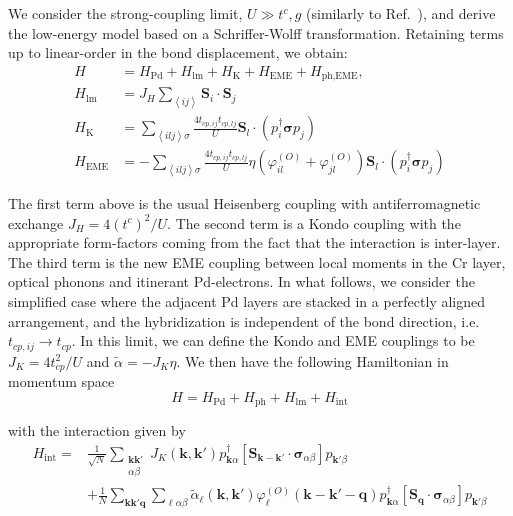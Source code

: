 \documentclass[aps,prl,twocolumn,superscriptaddress,amsmath,nofootinbib,10pt,floatfix]{revtex4-2}
\begin{document}
\begin{widetext}
We consider the strong-coupling limit, $U\gg t^{c},g$ (similarly to Ref.~\cite{sunko_probing_2020}), and derive the low-energy model based on a Schriffer-Wolff transformation. Retaining terms up to linear-order in the bond displacement, we obtain:
\begin{align}
H & =H_{\text{Pd}}+H_{\text{lm}}+H_{\text{K}}+H_{\text{EME}}+H_{\text{ph,EME}},\\
H_{\text{lm}} & =J_{H}\sum_{\left\langle ij\right\rangle }\boldsymbol{S}_{i}\cdot\boldsymbol{S}_{j}\\
H_{\text{K}} & =\sum_{\left\langle ilj\right\rangle \sigma}\frac{4t_{cp,ij}t_{cp,lj}}{U}\boldsymbol{S}_{l}\cdot\left(p_{i}^{\dagger}\boldsymbol{\sigma}p_{j}\right)\\
H_{\text{EME}} & =-\sum_{\left\langle ilj\right\rangle \sigma}\frac{4t_{cp,ij}t_{cp,lj}}{U}\eta\left(\varphi^{(O)}_{il}+\varphi^{(O)}_{jl}\right)\boldsymbol{S}_{l}\cdot\left(p_{i}^{\dagger}\boldsymbol{\sigma}p_{j}\right)
\end{align}

The first term above is the usual Heisenberg coupling with antiferromagnetic
exchange $J_{H}=4(t^{c})^2/U$. The second term  is a Kondo coupling \cite{sunko_probing_2020} with the appropriate form-factors coming from the fact that the interaction is inter-layer. The third term is the new EME coupling
between local moments in the Cr layer, optical phonons and itinerant Pd-electrons. In what follows, we consider the simplified case where the adjacent Pd layers are stacked in a perfectly aligned arrangement, and the hybridization is independent of the bond direction, i.e. $t_{cp,ij}\rightarrow t_{cp}$. In
this limit, we can define the Kondo and EME couplings to be $J_{K}=4t_{cp}^{2}/U$
and $\tilde{\alpha}=-J_{K}\eta$. We then have the following Hamiltonian
in momentum space
\begin{equation}
H=H_{\text{Pd}}+H_{\text{ph}}+H_{\text{lm}}+H_{\text{int}}
\end{equation}

with the interaction given by
\begin{align}
H_{\text{int}}= & \frac{1}{\sqrt{N}}\sum_{\substack{\bm{k}\bm{k}'\\
\alpha\beta
}
}J_{K}\left(\boldsymbol{k},\boldsymbol{k}'\right)p_{\boldsymbol{k}\alpha}^{\dagger}\left[\boldsymbol{S}_{\boldsymbol{k}-\boldsymbol{k}'}\cdot\boldsymbol{\sigma}_{\alpha\beta}\right]p_{\boldsymbol{k}'\beta}\\
 & +\frac{1}{N}\sum_{\bm{k}\bm{k}'\bm{q}}\sum_{\ell\alpha\beta}\tilde{\alpha}_{\ell}\left(\boldsymbol{k},\boldsymbol{k}'\right)\varphi^{(O)}_{\ell}\left(\boldsymbol{k}-\boldsymbol{k}'-\boldsymbol{q}\right)p_{\boldsymbol{k}\alpha}^{\dagger}\left[\boldsymbol{S}_{\boldsymbol{q}}\cdot\boldsymbol{\sigma}_{\alpha\beta}\right]p_{\boldsymbol{k}'\beta}
\end{align}


\end{widetext}
\end{document}
